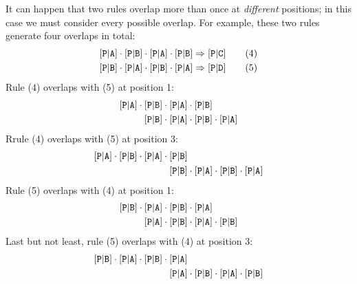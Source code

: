 \documentclass[../generics]{subfiles}
\begin{document}
\begin{example}
It can happen that two rules overlap more than once at \emph{different} positions; in this case we must consider every possible overlap. For example, these two rules generate four overlaps in total:
\begin{gather*}
\aPA\cdot\aPB\cdot\aPA\cdot\aPB\Rightarrow \aPC\tag{4}\\
\aPB\cdot\aPA\cdot\aPB\cdot\aPA\Rightarrow \assocsym{P}{D}\tag{5}
\end{gather*}
Rule (4) overlaps with (5) at position 1:
\begin{align*}
\aPA\cdot{}&\aPB\cdot\aPA\cdot\aPB\\
&\aPB\cdot\aPA\cdot\aPB\cdot\aPA
\end{align*}
Rrule (4) overlaps with (5) at position 3:
\begin{align*}
\aPA\cdot\aPB\cdot\aPA\cdot{}&\aPB\\
&\aPB\cdot\aPA\cdot\aPB\cdot\aPA
\end{align*}
Rule (5) overlaps with (4) at position 1:
\begin{align*}
\aPB\cdot{}&\aPA\cdot\aPB\cdot\aPA\\
&\aPA\cdot\aPB\cdot\aPA\cdot\aPB
\end{align*}
Last but not least, rule (5) overlaps with (4) at position 3:
\begin{align*}
\aPB\cdot\aPA\cdot\aPB\cdot{}&\aPA\\
&\aPA\cdot\aPB\cdot\aPA\cdot\aPB
\end{align*}
\end{example}
\end{document}
